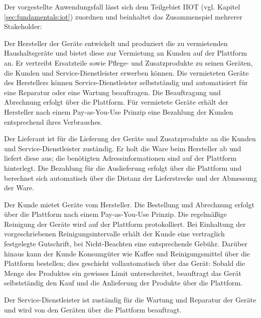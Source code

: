 Der vorgestellte Anwendungsfall lässt sich dem Teilgebiet \ac{IIOT} (vgl. Kapitel \ref{sec:fundamentals:iot}) zuordnen und beinhaltet das Zusammenspiel mehrerer Stakeholder:
\begin{description}
\label{description:chapter04:stakeholder}
  \item[Hersteller] Der Hersteller der Geräte entwickelt und produziert die zu vermietenden Haushaltsgeräte und bietet diese zur Vermietung an Kunden auf der Plattform an. Er vertreibt Ersatzteile sowie Pflege- und Zusatzprodukte zu seinen Geräten, die Kunden und Service-Dienstleister erwerben können. Die vermieteten Geräte des Herstellers können Service-Dienstleister selbstständig und automatisiert für eine Reparatur oder eine Wartung beauftragen. Die Beauftragung und Abrechnung erfolgt über die Plattform. Für vermietete Geräte erhält der Hersteller nach einem Pay-as-You-Use Prinzip eine Bezahlung der Kunden entsprechend ihres Verbrauches.
  \item[Lieferant] Der Lieferant ist für die Lieferung der Geräte und Zusatzprodukte an die Kunden und Service-Dienstleister zuständig. Er holt die Ware beim Hersteller ab und liefert diese aus; die benötigten Adressinformationen sind auf der Plattform hinterlegt. Die Bezahlung für die Auslieferung erfolgt über die Plattform und berechnet sich automatisch über die Distanz der Lieferstrecke und der Abmessung der Ware.
  \item[Kunde] Der Kunde mietet Geräte vom Hersteller. Die Bestellung und Abrechnung erfolgt über die Plattform nach einem Pay-as-You-Use Prinzip. Die regelmäßige Reinigung der Geräte wird auf der Plattform protokolliert. Bei Einhaltung der vorgeschriebenen Reinigungsintervalle erhält der Kunde eine vertraglich festgelegte Gutschrift, bei Nicht-Beachten eine entsprechende Gebühr.  Darüber hinaus kann der Kunde Konsumgüter wie Kaffee und Reinigungsmittel über die Plattform bestellen; dies geschieht vollautomatisch über das Gerät: Sobald die Menge des Produktes ein gewisses Limit unterschreitet, beauftragt das Gerät selbstständig den Kauf und die Anlieferung der Produkte über die Plattform.
  \item[Service-Dienstleister] Der Service-Dienstleister ist zuständig für die Wartung und Reparatur der Geräte und wird von den Geräten über die Plattform beauftragt.
\end{description}

